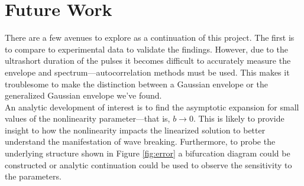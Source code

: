 \section{Future Work}
There are a few avenues to explore as a continuation of this project. The first is to compare to experimental data to validate the findings. However, due to the ultrashort duration of the pulses it becomes difficult to accurately measure the envelope and spectrum---autocorrelation methods must be used. This makes it troublesome to make the distinction between a Gaussian envelope or the generalized Gaussian envelope we've found. \\

An analytic development of interest is to find the asymptotic expansion for small values of the nonlinearity parameter---that is, $b \rightarrow 0$. This is likely to provide insight to how the nonlinearity  impacts the linearized solution to better understand the manifestation of wave breaking. Furthermore, to probe the underlying structure shown in Figure \ref{fig:error} a bifurcation diagram could be constructed or analytic continuation could be used to observe the sensitivity to the parameters. \\

